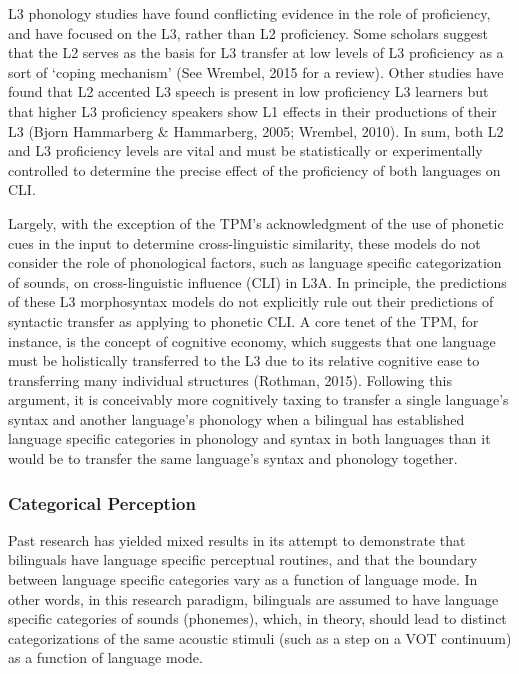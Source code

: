 \documentclass[
  english,
  man]{apa6}
\begin{document}
L3 phonology studies have found conflicting evidence in the role of proficiency, and have focused on the L3, rather than L2 proficiency.
Some scholars suggest that the L2 serves as the basis for L3 transfer at low levels of L3 proficiency as a sort of `coping mechanism' (See Wrembel, 2015 for a review).
Other studies have found that L2 accented L3 speech is present in low proficiency L3 learners but that higher L3 proficiency speakers show L1 effects in their productions of their L3 (Bjorn Hammarberg \& Hammarberg, 2005; Wrembel, 2010).
In sum, both L2 and L3 proficiency levels are vital and must be statistically or experimentally controlled to determine the precise effect of the proficiency of both languages on CLI.

Largely, with the exception of the TPM's acknowledgment of the use of phonetic cues in the input to determine cross-linguistic similarity, these models do not consider the role of phonological factors, such as language specific categorization of sounds, on cross-linguistic influence (CLI) in L3A. In principle, the predictions of these L3 morphosyntax models do not explicitly rule out their predictions of syntactic transfer as applying to phonetic CLI. A core tenet of the TPM, for instance, is the concept of cognitive economy, which suggests that one language must be holistically transferred to the L3 due to its relative cognitive ease to transferring many individual structures (Rothman, 2015). Following this argument, it is conceivably more cognitively taxing to transfer a single language's syntax and another language's phonology when a bilingual has established language specific categories in phonology and syntax in both languages than it would be to transfer the same language's syntax and phonology together.

\hypertarget{categorical-perception}{%
\subsubsection{Categorical Perception}\label{categorical-perception}}

Past research has yielded mixed results in its attempt to demonstrate that bilinguals have language specific perceptual routines, and that the boundary between language specific categories vary as a function of language mode. In other words, in this research paradigm, bilinguals are assumed to have language specific categories of sounds (phonemes), which, in theory, should lead to distinct categorizations of the same acoustic stimuli (such as a step on a VOT continuum) as a function of language mode.
\end{document}

